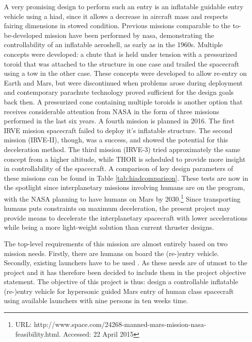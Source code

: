 A very promising design to perform such an entry is an inflatable guidable entry vehicle using a \gls{hiad}, since it allows a decrease in aircraft mass and respects fairing dimensions in stowed condition. Previous missions comparable to the to-be-developed mission have been performed by \gls{nasa}, demonstrating the controllability of an inflatable aeroshell, as early as in the 1960s. Multiple concepts were developed: a chute that is held under tension with a pressurized toroid that was attached to the structure in one case and trailed the spacecraft using a tow in the other case. These concepts were developed to allow re-entry on Earth and Mars, but were discontinued when problems arose during deployment and contemporary parachute technology proved sufficient for the design goals back then. \citep{hiadhistory}
A pressurized cone containing multiple toroids is another option that receives considerable attention from NASA in the form of three missions performed in the last six years. A fourth mission is planned in 2016. The first IRVE mission spacecraft failed to deploy it's inflatable structure. The second mission (IRVE-II), though, was a success, and showed the potential for this deceleration method. The third mission (IRVE-3) tried approximately the same concept from a higher altitude, while THOR is scheduled to provide more insight in controllability of the spacecraft. \cite{irve,irve2,irve3,thor} 
A comparison of key design parameters of these missions can be found in Table \ref{tab:hiadcomparison}.
These tests are now in the spotlight since interplanetary missions involving humans are on the program, with the NASA planning to have humans on Mars by 2030.\footnote{URL: http://www.space.com/24268-manned-mars-mission-nasa-feasibility.html. Accessed: 22 April 2015} Since transporting humans puts constraints on maximum deceleration, the present project may provide means to decelerate the interplanetary spacecraft with lower accelerations while being a more light-weight solution than current thruster designs.

The top-level requirements of this mission are almost entirely based on two mission needs. Firstly, there are humans on board the (re-)entry vehicle. Secondly, existing launchers have to be used . As these needs are of utmost to the project and it has therefore been decided to include them in the project objective statement. The objective of this project is thus: design a controllable inflatable (re-)entry vehicle for hypersonic guided Mars entry of human class spacecraft using available launchers with nine persons in ten weeks time.

